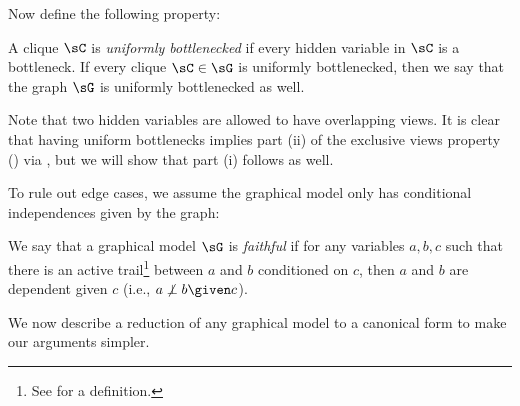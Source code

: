Now define the following property:
\begin{property}
  \label{prop:bottleneck}
  A clique $\sC$ is \emph{uniformly bottlenecked} if
  every hidden variable in $\sC$ is a bottleneck. 
  If every clique $\sC \in \sG$ is uniformly bottlenecked, then we say
  that the graph $\sG$ is uniformly bottlenecked as well.
\end{property}
Note that two hidden variables are allowed to have overlapping views.
It is clear that having uniform bottlenecks implies part (ii)
of the exclusive views property () via \TensorFactorize,
but we will show that part (i) follows as well.

To rule out edge cases, we assume the graphical model only has conditional
independences given by the graph:
\begin{property}
  \label{prop:ci}  
  We say that a graphical model $\sG$ is \emph{faithful}
  if for any variables $a,b,c$
  such that there is an active trail\footnote{See
  \citet{koller2009probabilistic} for a definition.} between $a$ and $b$
  conditioned on $c$,
  then $a$ and $b$ are dependent given $c$ (i.e., $a\not\perp b \given c$).
\end{property}



We now describe a reduction of any graphical model to
  a canonical form to make our arguments simpler.

